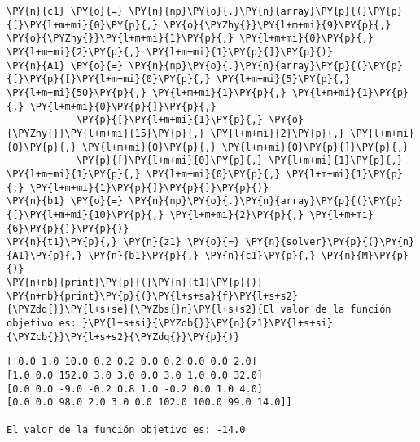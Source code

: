 \documentclass[12pt]{article}
\begin{document}
\begin{tcolorbox}[breakable, size=fbox, boxrule=1pt, pad at break*=1mm,colback=cellbackground, colframe=cellborder]
\begin{Verbatim}[commandchars=\\\{\}]
\PY{n}{c1} \PY{o}{=} \PY{n}{np}\PY{o}{.}\PY{n}{array}\PY{p}{(}\PY{p}{[}\PY{l+m+mi}{0}\PY{p}{,} \PY{o}{\PYZhy{}}\PY{l+m+mi}{9}\PY{p}{,} \PY{o}{\PYZhy{}}\PY{l+m+mi}{1}\PY{p}{,} \PY{l+m+mi}{0}\PY{p}{,} \PY{l+m+mi}{2}\PY{p}{,} \PY{l+m+mi}{1}\PY{p}{]}\PY{p}{)}
\PY{n}{A1} \PY{o}{=} \PY{n}{np}\PY{o}{.}\PY{n}{array}\PY{p}{(}\PY{p}{[}\PY{p}{[}\PY{l+m+mi}{0}\PY{p}{,} \PY{l+m+mi}{5}\PY{p}{,} \PY{l+m+mi}{50}\PY{p}{,} \PY{l+m+mi}{1}\PY{p}{,} \PY{l+m+mi}{1}\PY{p}{,} \PY{l+m+mi}{0}\PY{p}{]}\PY{p}{,}
            \PY{p}{[}\PY{l+m+mi}{1}\PY{p}{,} \PY{o}{\PYZhy{}}\PY{l+m+mi}{15}\PY{p}{,} \PY{l+m+mi}{2}\PY{p}{,} \PY{l+m+mi}{0}\PY{p}{,} \PY{l+m+mi}{0}\PY{p}{,} \PY{l+m+mi}{0}\PY{p}{]}\PY{p}{,}
            \PY{p}{[}\PY{l+m+mi}{0}\PY{p}{,} \PY{l+m+mi}{1}\PY{p}{,} \PY{l+m+mi}{1}\PY{p}{,} \PY{l+m+mi}{0}\PY{p}{,} \PY{l+m+mi}{1}\PY{p}{,} \PY{l+m+mi}{1}\PY{p}{]}\PY{p}{]}\PY{p}{)}
\PY{n}{b1} \PY{o}{=} \PY{n}{np}\PY{o}{.}\PY{n}{array}\PY{p}{(}\PY{p}{[}\PY{l+m+mi}{10}\PY{p}{,} \PY{l+m+mi}{2}\PY{p}{,} \PY{l+m+mi}{6}\PY{p}{]}\PY{p}{)}
\PY{n}{t1}\PY{p}{,} \PY{n}{z1} \PY{o}{=} \PY{n}{solver}\PY{p}{(}\PY{n}{A1}\PY{p}{,} \PY{n}{b1}\PY{p}{,} \PY{n}{c1}\PY{p}{,} \PY{n}{M}\PY{p}{)}
\PY{n+nb}{print}\PY{p}{(}\PY{n}{t1}\PY{p}{)}
\PY{n+nb}{print}\PY{p}{(}\PY{l+s+sa}{f}\PY{l+s+s2}{\PYZdq{}}\PY{l+s+se}{\PYZbs{}n}\PY{l+s+s2}{El valor de la función objetivo es: }\PY{l+s+si}{\PYZob{}}\PY{n}{z1}\PY{l+s+si}{\PYZcb{}}\PY{l+s+s2}{\PYZdq{}}\PY{p}{)}
\end{Verbatim}
\end{tcolorbox}

\begin{Verbatim}[commandchars=\\\{\}]
[[0.0 1.0 10.0 0.2 0.2 0.0 0.2 0.0 0.0 2.0]
[1.0 0.0 152.0 3.0 3.0 0.0 3.0 1.0 0.0 32.0]
[0.0 0.0 -9.0 -0.2 0.8 1.0 -0.2 0.0 1.0 4.0]
[0.0 0.0 98.0 2.0 3.0 0.0 102.0 100.0 99.0 14.0]]

El valor de la función objetivo es: -14.0
\end{Verbatim}
\end{document}
